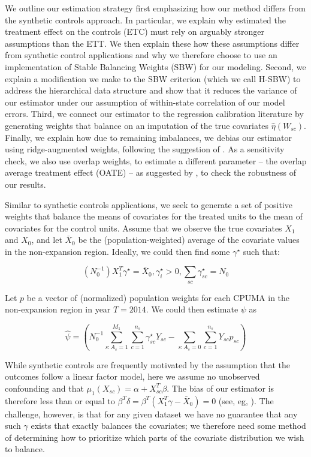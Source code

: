 \documentclass[12pt]{article}
\begin{document}
We outline our estimation strategy first emphasizing how our method differs from the synthetic controls approach. In particular, we explain why estimated the treatment effect on the controls (ETC) must rely on arguably stronger assumptions than the ETT. We then explain these how these assumptions differ from synthetic control applications and why we therefore choose to use an implementation of Stable Balancing Weights (SBW) for our modeling. Second, we explain a modification we make to the SBW criterion (which we call H-SBW) to address the hierarchical data structure and show that it reduces the variance of our estimator under our assumption of within-state correlation of our model errors. Third, we connect our estimator to the regression calibration literature by generating weights that balance on an imputation of the true covariates $\hat{\eta}(W_{sc})$. Finally, we explain how due to remaining imbalances, we debias our estimator using ridge-augmented weights, following the suggestion of \cite{ben2018augmented}. As a sensitivity check, we also use overlap weights, to estimate a different parameter -- the overlap average treatment effect (OATE) -- as suggested by \cite{li2018balancing}, to check the robustness of our results.

Similar to synthetic controls applications, we seek to generate a set of positive weights that balance the means of covariates for the treated units to the mean of covariates for the control units. Assume that we observe the true covariates $X_1$ and $X_0$, and let $\bar{X}_0$ be the (population-weighted) average of the covariate values in the non-expansion region. Ideally, we could then find some $\gamma^\star$ such that: 

$$
(N_0^{-1})X_1^T\gamma^\star = \bar{X}_0, \gamma_i^\star > 0, \sum_{sc} \gamma_{sc}^\star = N_0
$$

Let $p$ be a vector of (normalized) population weights for each CPUMA in the non-expansion region in year $T = 2014$. We could then estimate $\psi$ as

$$
\hat{\psi} = (N_0^{-1}\sum_{s: A_s = 1}^{M_1}\sum_{c = 1}^{n_s}\gamma_{sc}^\star Y_{sc} - \sum_{s: A_s = 0}\sum_{c = 1}^{n_s}Y_{sc}p_{sc})
$$

While synthetic controls are frequently motivated by the assumption that the outcomes follow a linear factor model, here we assume no unobserved confounding and that $\mu_1(X_{sc}) = \alpha + X_{sc}^T\beta$. The bias of our estimator is therefore less than or equal to $\beta^T \delta = \beta^T(X_1^T\gamma - \bar{X}_0) = 0$ (see, eg, \cite{zubizarreta2015stable}). The challenge, however, is that for any given dataset we have no guarantee that any such $\gamma$ exists that exactly balances the covariates; we therefore need some method of determining how to prioritize which parts of the covariate distribution we wish to balance.
\end{document}
